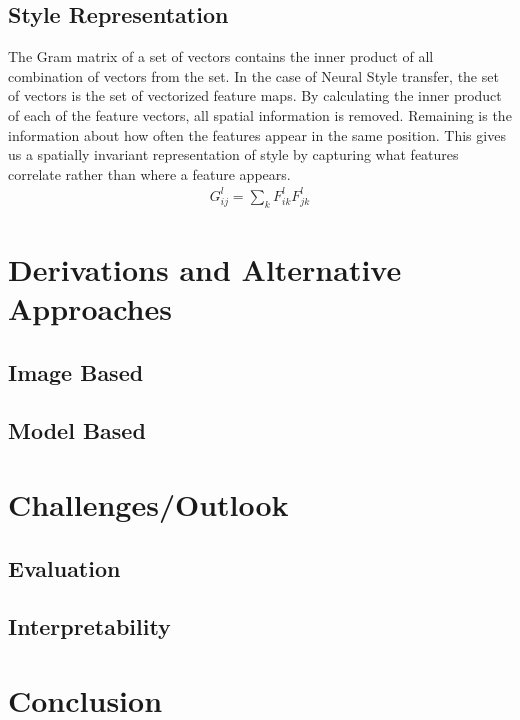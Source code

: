 \documentclass{seminar}
\begin{document}
\subsection{Style Representation}
The Gram matrix of a set of vectors contains the inner product of all combination of vectors from the set. In the case of Neural Style transfer, the set of vectors is the set of vectorized feature maps.
By calculating the inner product of each of the feature vectors, all spatial information is removed. Remaining is the information about how often the features appear in the same position. This gives us a spatially invariant representation of style by capturing what features correlate rather than where a feature appears.
\begin{align}
	G^l_{ij} = \sum_{k} F^l_{ik}F^l_{jk}
\end{align}


\section{Derivations and Alternative Approaches}
\subsection{Image Based}
\subsection{Model Based}










\section{Challenges/Outlook}
\subsection{Evaluation}
\subsection{Interpretability}


	
	
	
	
\section{Conclusion}





\newpage






\end{document}
